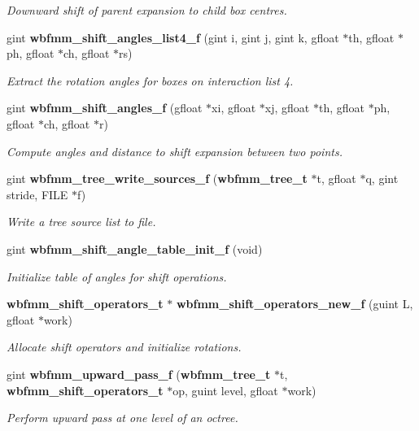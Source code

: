 \begin{DoxyCompactItemize}
\begin{DoxyCompactList}\small\item\em Downward shift of parent expansion to child box centres. \end{DoxyCompactList}\item 
gint {\bf wbfmm\+\_\+shift\+\_\+angles\+\_\+list4\+\_\+f} (gint i, gint j, gint k, gfloat $\ast$th, gfloat $\ast$ph, gfloat $\ast$ch, gfloat $\ast$rs)
\begin{DoxyCompactList}\small\item\em Extract the rotation angles for boxes on interaction list 4. \end{DoxyCompactList}\item 
gint {\bf wbfmm\+\_\+shift\+\_\+angles\+\_\+f} (gfloat $\ast$xi, gfloat $\ast$xj, gfloat $\ast$th, gfloat $\ast$ph, gfloat $\ast$ch, gfloat $\ast$r)
\begin{DoxyCompactList}\small\item\em Compute angles and distance to shift expansion between two points. \end{DoxyCompactList}\item 
gint {\bf wbfmm\+\_\+tree\+\_\+write\+\_\+sources\+\_\+f} ({\bf wbfmm\+\_\+tree\+\_\+t} $\ast$t, gfloat $\ast$q, gint stride, F\+I\+L\+E $\ast$f)
\begin{DoxyCompactList}\small\item\em Write a tree source list to file. \end{DoxyCompactList}\item 
gint {\bf wbfmm\+\_\+shift\+\_\+angle\+\_\+table\+\_\+init\+\_\+f} (void)
\begin{DoxyCompactList}\small\item\em Initialize table of angles for shift operations. \end{DoxyCompactList}\item 
{\bf wbfmm\+\_\+shift\+\_\+operators\+\_\+t} $\ast$ {\bf wbfmm\+\_\+shift\+\_\+operators\+\_\+new\+\_\+f} (guint L, gfloat $\ast$work)
\begin{DoxyCompactList}\small\item\em Allocate shift operators and initialize rotations. \end{DoxyCompactList}\item 
gint {\bf wbfmm\+\_\+upward\+\_\+pass\+\_\+f} ({\bf wbfmm\+\_\+tree\+\_\+t} $\ast$t, {\bf wbfmm\+\_\+shift\+\_\+operators\+\_\+t} $\ast$op, guint level, gfloat $\ast$work)
\begin{DoxyCompactList}\small\item\em Perform upward pass at one level of an octree. \end{DoxyCompactList}\item 

\end{DoxyCompactItemize}
